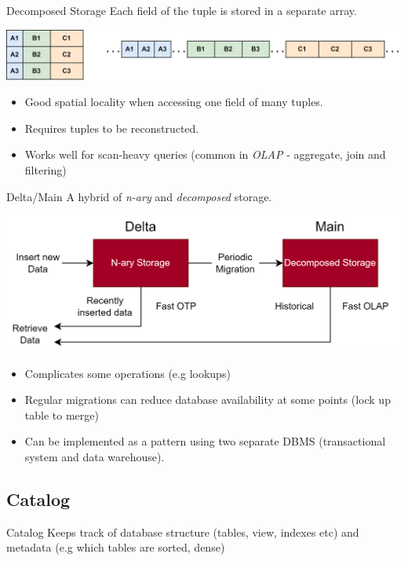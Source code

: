 \begin{definitionbox}{Decomposed Storage}
    Each field of the tuple is stored in a separate array.
    \begin{center}
        \includegraphics[width=.8\textwidth]{storage/images/decomposed_layout.drawio.png}
    \end{center}
    \begin{itemize}
        \item Good spatial locality when accessing one field of many tuples.
        \item Requires tuples to be reconstructed.
        \item Works well for scan-heavy queries (common in \textit{OLAP} - aggregate, join and filtering)
    \end{itemize}
\end{definitionbox}

\begin{definitionbox}{Delta/Main}
    A hybrid of \textit{n-ary} and \textit{decomposed} storage.
    \begin{center}
        \includegraphics[width=.8\textwidth]{storage/images/delta_main.drawio.png}
    \end{center}
    \begin{itemize}
        \item Complicates some operations (e.g lookups)
        \item Regular migrations can reduce database availability at some points (lock up table to merge)
        \item Can be implemented as a pattern using two separate DBMS (transactional system and data warehouse).
    \end{itemize}
\end{definitionbox}

    
\subsection{Catalog}
\begin{definitionbox}{Catalog}
    Keeps track of database structure (tables, view, indexes etc) and metadata (e.g which tables are sorted, dense)
\end{definitionbox}

